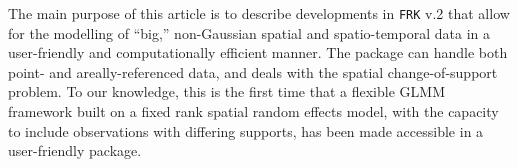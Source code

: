 \documentclass[12pt,a4paper]{article}
\begin{document}
The main purpose of this article is to describe developments in \texttt{FRK} v.2 that allow for the modelling of ``big,'' non-Gaussian spatial and spatio-temporal data in a user-friendly and computationally efficient manner. 
The package can handle both point- and areally-referenced data, and deals with the spatial change-of-support problem. 
To our knowledge, this is the first time that a flexible GLMM framework built on a fixed rank spatial random effects model, with the capacity to include observations with differing supports, has been made accessible in a user-friendly package.


\end{document}
